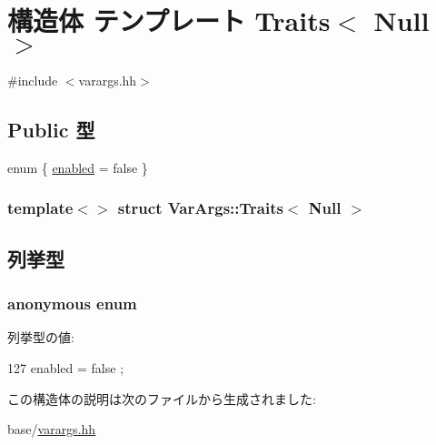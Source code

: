 \hypertarget{structVarArgs_1_1Traits_3_01Null_01_4}{
\section{構造体 テンプレート Traits$<$ Null $>$}
\label{structVarArgs_1_1Traits_3_01Null_01_4}
}


{\ttfamily \#include $<$varargs.hh$>$}\subsection*{Public 型}
\begin{DoxyCompactItemize}
\item 
enum \{ \hyperlink{structVarArgs_1_1Traits_3_01Null_01_4_a94798fdadfbf49a7c658ace669a1d310aba6a78ff01a05c6cc4cfb2f4ca21cedc}{enabled} =  false
 \}
\end{DoxyCompactItemize}
\subsubsection*{template$<$$>$ struct VarArgs::Traits$<$ Null $>$}



\subsection{列挙型}
\hypertarget{structVarArgs_1_1Traits_3_01Null_01_4_a94798fdadfbf49a7c658ace669a1d310}{
\subsubsection[{"@24}]{\setlength{\rightskip}{0pt plus 5cm}anonymous enum}}
\label{structVarArgs_1_1Traits_3_01Null_01_4_a94798fdadfbf49a7c658ace669a1d310}
\begin{Desc}
\item[列挙型の値: ]\par
\begin{description}
\item[{\em 
\hypertarget{structVarArgs_1_1Traits_3_01Null_01_4_a94798fdadfbf49a7c658ace669a1d310aba6a78ff01a05c6cc4cfb2f4ca21cedc}{
enabled}
\label{structVarArgs_1_1Traits_3_01Null_01_4_a94798fdadfbf49a7c658ace669a1d310aba6a78ff01a05c6cc4cfb2f4ca21cedc}
}]\end{description}
\end{Desc}




\begin{DoxyCode}
127 { enabled = false };
\end{DoxyCode}


この構造体の説明は次のファイルから生成されました:\begin{DoxyCompactItemize}
\item 
base/\hyperlink{varargs_8hh}{varargs.hh}\end{DoxyCompactItemize}
